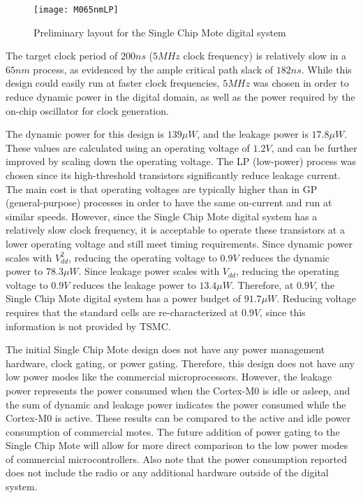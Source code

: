 \begin{figure}
\centering
\texttt{[image: M065nmLP]}
\caption{Preliminary layout for the Single Chip Mote digital system}
\label{fig:M065nmLP}
\end{figure}

The target clock period of $200ns$ ($5MHz$ clock frequency) is relatively slow in a $65nm$ process, as evidenced by the ample critical path slack of $182ns$. While this design could easily run at faster clock frequencies, $5MHz$ was chosen in order to reduce dynamic power in the digital domain, as well as the power required by the on-chip oscillator for clock generation.

The dynamic power for this design is $139\mu W$, and the leakage power is $17.8\mu W$. These values are calculated using an operating voltage of $1.2V$, and can be further improved by scaling down the operating voltage. The LP (low-power) process was chosen since its high-threshold transistors significantly reduce leakage current. The main cost is that operating voltages are typically higher than in GP (general-purpose) processes in order to have the same on-current and run at similar speeds. However, since the Single Chip Mote digital system has a relatively slow clock frequency, it is acceptable to operate these transistors at a lower operating voltage and still meet timing requirements. Since dynamic power scales with $V_{dd}^2$, reducing the operating voltage to $0.9V$ reduces the dynamic power to $78.3\mu W$. Since leakage power scales with $V_{dd}$, reducing the operating voltage to $0.9V$ reduces the leakage power to $13.4\mu W$. Therefore, at $0.9V$, the Single Chip Mote digital system has a power budget of $91.7\mu W$. Reducing voltage requires that the standard cells are re-characterized at $0.9V$, since this information is not provided by TSMC.

The initial Single Chip Mote design does not have any power management hardware, clock gating, or power gating. Therefore, this design does not have any low power modes like the commercial microprocessors. However, the leakage power represents the power consumed when the Cortex-M0 is idle or asleep, and the sum of dynamic and leakage power indicates the power consumed while the Cortex-M0 is active. These results can be compared to the active and idle power consumption of commercial motes. The future addition of power gating to the Single Chip Mote will allow for more direct comparison to the low power modes of commercial microcontrollers. Also note that the power consumption reported does not include the radio or any additional hardware outside of the digital system.

